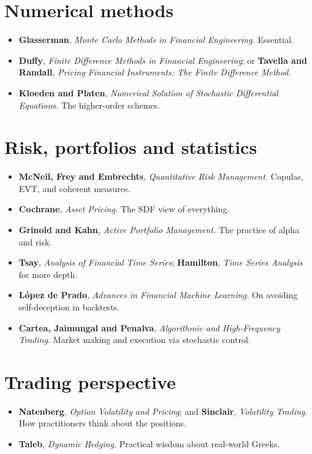 \section*{Numerical methods}
\begin{itemize}
\item \textbf{Glasserman}, \emph{Monte Carlo Methods in Financial Engineering.} Essential.
\item \textbf{Duffy}, \emph{Finite Difference Methods in Financial Engineering}; or \textbf{Tavella and Randall}, \emph{Pricing Financial Instruments: The Finite Difference Method.}
\item \textbf{Kloeden and Platen}, \emph{Numerical Solution of Stochastic Differential Equations.} The higher-order schemes.
\end{itemize}

\section*{Risk, portfolios and statistics}
\begin{itemize}
\item \textbf{McNeil, Frey and Embrechts}, \emph{Quantitative Risk Management.} Copulas, EVT, and coherent measures.
\item \textbf{Cochrane}, \emph{Asset Pricing.} The SDF view of everything.
\item \textbf{Grinold and Kahn}, \emph{Active Portfolio Management.} The practice of alpha and risk.
\item \textbf{Tsay}, \emph{Analysis of Financial Time Series}; \textbf{Hamilton}, \emph{Time Series Analysis} for more depth.
\item \textbf{L\'opez de Prado}, \emph{Advances in Financial Machine Learning.} On avoiding self-deception in backtests.
\item \textbf{Cartea, Jaimungal and Penalva}, \emph{Algorithmic and High-Frequency Trading.} Market making and execution via stochastic control.
\end{itemize}

\section*{Trading perspective}
\begin{itemize}
\item \textbf{Natenberg}, \emph{Option Volatility and Pricing}; and \textbf{Sinclair}, \emph{Volatility Trading.} How practitioners think about the positions.
\item \textbf{Taleb}, \emph{Dynamic Hedging.} Practical wisdom about real-world Greeks.
\end{itemize}


